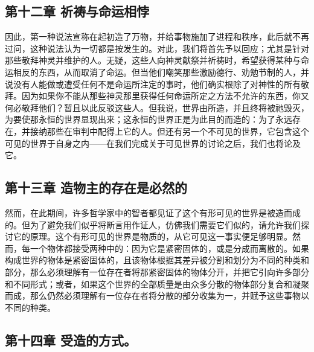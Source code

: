 
\subsection{第十二章 祈祷与命运相悖}

因此，第一种说法宣称在起初造了万物，并给事物施加了进程和秩序，此后就不再过问，这种说法认为一切都是按发生的。对此，我们将首先予以回应；尤其是针对那些敬拜神灵并维护的人。无疑，这些人向神灵献祭并祈祷时，希望获得某种与命运相反的东西，从而取消了命运。但当他们嘲笑那些激励德行、劝勉节制的人，并说没有人能做或遭受任何不是命运所注定的事时，他们确实根除了对神性的所有敬拜。因为如果你不能从那些神灵那里获得任何命运所定之方法不允许的东西，你又何必敬拜他们？暂且以此反驳这些人。但我说，世界由所造，并且终将被祂毁灭，为要使那永恒的世界显现出来；这永恒的世界正是为此目的而造的：为了永远存在，并接纳那些在审判中配得上它的人。但还有另一个不可见的世界，它包含这个可见的世界于自身之内——在我们完成关于可见世界的讨论之后，我们也将论及它。\par


\subsection{第十三章 造物主的存在是必然的}

然而，在此期间，许多哲学家中的智者都见证了这个有形可见的世界是被造而成的。但为了避免我们似乎将断言用作证人，仿佛我们需要它们似的，请允许我们探讨它的原理。这个有形可见的世界是物质的，从它可见这一事实便足够明显。然而，每一个物体都接受两种中的：因为它是紧密固体的，或是分成而离散的。如果构成世界的物体是紧密固体的，且该物体根据其差异被分割和划分为不同的种类和部分，那么必须理解有一位存在者将那紧密固体的物体分开，并把它引向许多部分和不同形式；或者，如果这个世界的全部质量是由众多分散的物体部分复合和凝聚而成，那么仍然必须理解有一位存在者将分散的部分收集为一，并赋予这些事物以不同的种类。\par


\subsection{第十四章 受造的方式。}

